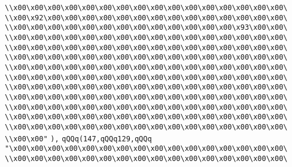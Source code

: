 \verb|\\x00\x00\x00\x00\x00\x00\x00\x00\x00\x00\x00\x00\x00\x00\x00\x00\|\newline
\verb|\\x00\x92\x00\x00\x00\x00\x00\x00\x00\x00\x00\x00\x00\x00\x00\x00\|\newline
\verb|\\x00\x00\x00\x00\x00\x00\x00\x00\x00\x00\x00\x00\x00\x93\x00\x00\|\newline
\verb|\\x00\x00\x00\x00\x00\x00\x00\x00\x00\x00\x00\x00\x00\x00\x00\x00\|\newline
\verb|\\x00\x00\x00\x00\x00\x00\x00\x00\x00\x00\x00\x00\x00\x00\x00\x00\|\newline
\verb|\\x00\x00\x00\x00\x00\x00\x00\x00\x00\x00\x00\x00\x00\x00\x00\x00\|\newline
\verb|\\x00\x00\x00\x00\x00\x00\x00\x00\x00\x00\x00\x00\x00\x00\x00\x00\|\newline
\verb|\\x00\x00\x00\x00\x00\x00\x00\x00\x00\x00\x00\x00\x00\x00\x00\x00\|\newline
\verb|\\x00\x00\x00\x00\x00\x00\x00\x00\x00\x00\x00\x00\x00\x00\x00\x00\|\newline
\verb|\\x00\x00\x00\x00\x00\x00\x00\x00\x00\x00\x00\x00\x00\x00\x00\x00\|\newline
\verb|\\x00\x00\x00\x00\x00\x00\x00\x00\x00\x00\x00\x00\x00\x00\x00\x00\|\newline
\verb|\\x00\x00\x00\x00\x00\x00\x00\x00\x00\x00\x00\x00\x00\x00\x00\x00\|\newline
\verb|\\x00\x00\x00\x00\x00\x00\x00\x00\x00\x00\x00\x00\x00\x00\x00\x00\|\newline
\verb|\\x00\x00"|\newline
\verb|),|\newline
\verb|qQQq(147,qQQq129,qQQq|\newline
\verb|"\x00\x00\x00\x00\x00\x00\x00\x00\x00\x00\x00\x00\x00\x00\x00\x00\|\newline
\verb|\\x00\x00\x00\x00\x00\x00\x00\x00\x00\x00\x00\x00\x00\x00\x00\x00\|\newline
